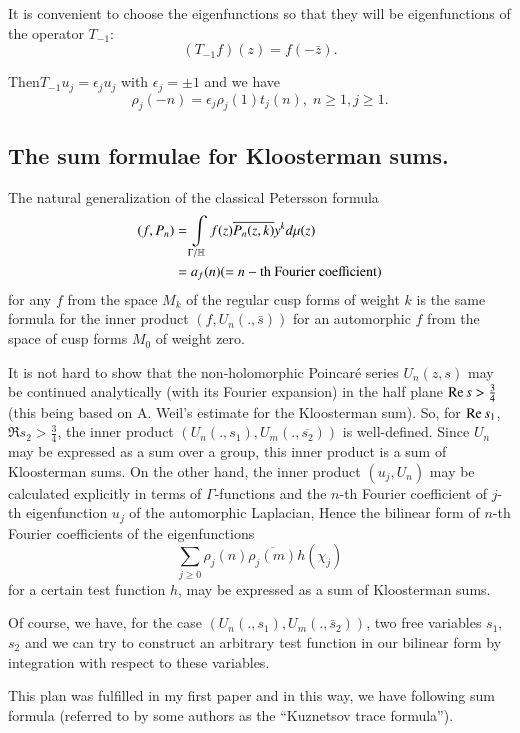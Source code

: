 It is convenient to choose the eigenfunctions so that they will be eigenfunctions of the operator $T_{-1}$:
$$
(T_{-1} f) (z) = f(-\bar{z}).
$$

Then\pageoriginale $T_{-1} u_j =\epsilon_j u_j$ with $\epsilon_j = \pm 1$ and we have
\begin{equation}
\rho_j (-n) = \epsilon_j \rho_j (1) t_j (n), \; n \geqslant 1, j \geqslant 1.  \label{art7-eq1.23}
\end{equation}

\subsection{The sum formulae for Kloosterman sums.}\label{art7-subsec1.5}
The natural generalization of the classical Petersson formula
\begin{align}
(f,P_n) & = \int\limits_{\Gamma/\mathbb{H}} f (z) \overline{P_n (z,k)} y^k d\mu(z) \label{art7-eq1.24} \\
& = a_f (n) (= n-\text{th Fourier coefficient}) \notag
\end{align}
for any $f$ from the space $M_k$ of the regular cusp forms of weight $k$ is the same formula for the inner product $(f, U_n(., \bar{s}))$ for an automorphic $f$ from the space of cusp forms $M_0$ of weight zero.

It is not hard to show that the non-holomorphic Poincar\'e series $U_n(z,s)$ may be continued analytically (with its Fourier expansion) in the half plane $\operatorname{Re} s > \frac{3}{4}$ (this being based on A. Weil's estimate for the Kloosterman sum). So, for $\operatorname{Re} s_1$, $\Re s_2 > \frac{3}{4}$, the inner product $(U_n (., s_1), U_m (., \overline{s_2}))$ is well-defined. Since $U_n$ may be expressed as a sum over a group, this inner product is a sum of Kloosterman sums. On the other hand, the inner product $(u_j, U_n)$ may be calculated explicitly in terms of $\Gamma$-functions and the $n$-th Fourier coefficient of $j$-th eigenfunction $u_j$ of the automorphic Laplacian, Hence the bilinear form of $n$-th Fourier coefficients of the eigenfunctions 
$$
\sum\limits_{j \geqslant 0} \rho_j (n) \overline{\rho_j(m)} h (\chi_j)
$$
for a certain test function $h$, may be expressed as a sum of Kloosterman sums. 

Of course, we have, for the case $(U_n (., s_1), U_m (., \bar{s}_2))$, two free variables $s_1$, $s_2$ and we can try to construct an arbitrary test function in our bilinear form by integration with respect to these variables.

This plan was fulfilled in my first paper and in this way, we have following sum formula (referred to by some authors as the ``Kuznetsov trace formula'').

